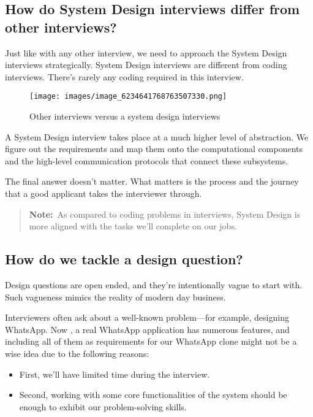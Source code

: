 \subsection{How do System Design interviews differ from other interviews?}\label{NQeNxrqfHqs-dvlwL9oyU}

Just like with any other interview, we need to approach the System Design interviews strategically. System Design interviews are different from coding interviews. There's rarely any coding required in this interview.

\begin{figure}[htbp]
 \centering
 \texttt{[image: images/image\_6234641768763507330.png]}
 \caption{Other interviews versus a system design interviews}
\end{figure}

A System Design interview takes place at a much higher level of abstraction. We figure out the requirements and map them onto the computational components and the high-level communication protocols that connect these subsystems.

The final answer doesn't matter. What matters is the process and the journey that a good applicant takes the interviewer through.
\begin{quote}
\textbf{Note:}~As compared to coding problems in interviews, System Design is more aligned with the tasks we'll complete on our jobs.
\end{quote}
\subsection{How do we tackle a design question?}\label{V2_cowfLOR7_6lrU-55Oc}

Design questions are open ended, and they're intentionally vague to start with. Such vagueness mimics the reality of modern day business.

Interviewers often ask about a well-known problem---for example, designing WhatsApp. Now , a real WhatsApp application has numerous features, and including all of them as requirements for our WhatsApp clone might not be a wise idea due to the following reasons:

\begin{itemize}
\item
{}\label{0uEfb-y7Eteyhlt2HMQKn}
First, we'll have limited time during the interview.
\item
{}\label{TGDVjaDwtQ0YTnO7z7MNh}
Second, working with some core functionalities of the system should be enough to exhibit our problem-solving skills.
\end{itemize}

